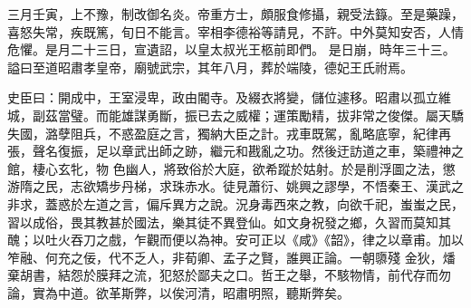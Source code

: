 \begin{pinyinscope}
 三月壬寅，上不豫，制改御名炎。帝重方士，頗服食修攝，親受法籙。至是藥躁，喜怒失常，疾既篤，旬日不能言。宰相李德裕等請見，不許。中外莫知安否，人情危懼。是月二十三日，宣遺詔，以皇太叔光王柩前即們。
 是日崩，時年三十三。謚曰至道昭肅孝皇帝，廟號武宗，其年八月，葬於端陵，德妃王氏祔焉。



 史臣曰：開成中，王室浸卑，政由閽寺。及綴衣將變，儲位遽移。昭肅以孤立維城，副茲當璧。而能雄謀勇斷，振已去之威權；運策勵精，拔非常之俊傑。屬天驕失國，潞孽阻兵，不惑盈庭之言，獨納大臣之計。戎車既駕，亂略底寧，紀律再張，聲名復振，足以章武出師之跡，繼元和戡亂之功。然後迂訪道之車，築禮神之館，棲心玄牝，物
 色幽人，將致俗於大庭，欲希蹤於姑射。於是削浮圖之法，懲游隋之民，志欲矯步丹梯，求珠赤水。徒見蕭衍、姚興之謬學，不悟秦王、漢武之非求，蓋惑於左道之言，偏斥異方之說。況身毒西來之教，向欲千祀，蚩蚩之民，習以成俗，畏其教甚於國法，樂其徒不異登仙。如文身祝發之鄉，久習而莫知其醜；以吐火吞刀之戲，乍觀而便以為神。安可正以《咸》《韶》，律之以章甫。加以笮融、何充之佞，代不乏人，非荀卿、孟子之賢，誰興正論。一朝隳殘
 金狄，燔棄胡書，結怨於膜拜之流，犯怒於鄙夫之口。哲王之舉，不駭物情，前代存而勿論，實為中道。欲革斯弊，以俟河清，昭肅明照，聽斯弊矣。



\end{pinyinscope}